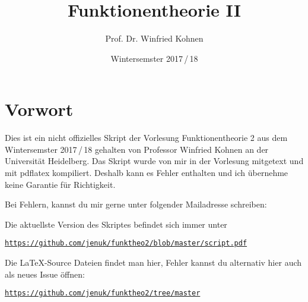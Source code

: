 \documentclass[parskip=half]{scrbook}
\title{Funktionentheorie II}
\author{Prof. Dr. Winfried Kohnen}
\date{Wintersemster 2017\,/\,18}
\begin{document}
\pagestyle{plain}

\maketitle

\chapter*{Vorwort}

Dies ist ein nicht offizielles Skript der Vorlesung Funktionentheorie 2 aus dem Wintersemster 2017\,/\,18 gehalten von Professor Winfried Kohnen an der Universität Heidelberg.
Das Skript wurde von mir in der Vorlesung mitgetext und mit pdflatex kompiliert.
Deshalb kann es Fehler enthalten und ich übernehme keine Garantie für Richtigkeit.

Bei Fehlern, kannst du mir gerne unter folgender Mailadresse schreiben:

\begin{center}
\end{center}

Die aktuellste Version des Skriptes befindet sich immer unter
\begin{center}
\texttt{\url{https://github.com/jenuk/funktheo2/blob/master/script.pdf}}
\end{center}

Die \LaTeX-Source Dateien findet man hier, Fehler kannst du alternativ hier auch als neues Issue öffnen:
\begin{center}
\texttt{\url{https://github.com/jenuk/funktheo2/tree/master}}
\end{center}

\clearpage
{}
{}
\tableofcontents

\clearpage
{}
\setcounter{page}{0}
\pagestyle{fancy}











\printindex

\cleardoublepage
{}
{}
\listoftheorems[ignoreall, onlynamed={satz,satz-list,satz-noind,satz-ind}]
\end{document}
